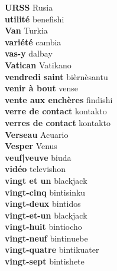 \textbf{ URSS  } Rusia \\
\textbf{ utilité  } benefishi \\
\textbf{ Van  } Turkia \\
\textbf{ variété  } cambia \\
\textbf{ vas-y  } dalbay \\
\textbf{ Vatican  } Vatikano \\
\textbf{ vendredi saint  } bièrnèsantu \\
\textbf{ venir à bout  } vense \\
\textbf{ vente aux enchères  } findishi \\
\textbf{ verre de contact  } kontakto \\
\textbf{ verres de contact  } kontakto \\
\textbf{ Verseau  } Acuario \\
\textbf{ Vesper  } Venus \\
\textbf{ veuf|veuve  } biuda \\
\textbf{ vidéo  } televishon \\
\textbf{ vingt et un  } blackjack \\
\textbf{ vingt-cinq  } bintisinku \\
\textbf{ vingt-deux  } bintidos \\
\textbf{ vingt-et-un  } blackjack \\
\textbf{ vingt-huit  } bintiocho \\
\textbf{ vingt-neuf  } bintinuebe \\
\textbf{ vingt-quatre  } bintikuater \\
\textbf{ vingt-sept  } bintishete \\
